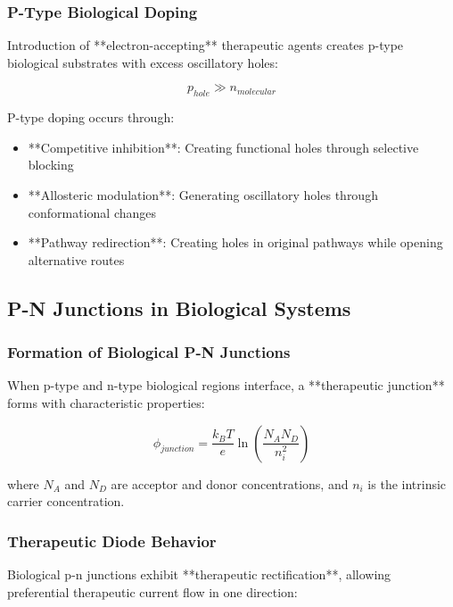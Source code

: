\subsubsection{P-Type Biological Doping}

Introduction of **electron-accepting** therapeutic agents creates p-type biological substrates with excess oscillatory holes:

\begin{equation}
p_{hole} \gg n_{molecular}
\end{equation}

P-type doping occurs through:
\begin{itemize}
\item **Competitive inhibition**: Creating functional holes through selective blocking
\item **Allosteric modulation**: Generating oscillatory holes through conformational changes
\item **Pathway redirection**: Creating holes in original pathways while opening alternative routes
\end{itemize}

\subsection{P-N Junctions in Biological Systems}

\subsubsection{Formation of Biological P-N Junctions}

When p-type and n-type biological regions interface, a **therapeutic junction** forms with characteristic properties:

\begin{equation}
\phi_{junction} = \frac{k_B T}{e} \ln\left(\frac{N_A N_D}{n_i^2}\right)
\end{equation}

where $N_A$ and $N_D$ are acceptor and donor concentrations, and $n_i$ is the intrinsic carrier concentration.

\subsubsection{Therapeutic Diode Behavior}

Biological p-n junctions exhibit **therapeutic rectification**, allowing preferential therapeutic current flow in one direction:

